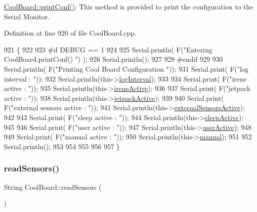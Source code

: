 \hyperlink{class_cool_board_a486507b8f0981d3cc671ed31c2145755}{Cool\+Board\+::print\+Conf()}\+: This method is provided to print the configuration to the Serial Monitor. 

Definition at line 920 of file Cool\+Board.\+cpp.


\begin{DoxyCode}
921 \{
922 
923 \textcolor{preprocessor}{#if DEBUG == 1}
924     
925     Serial.println( F(\textcolor{stringliteral}{"Entering CoolBoard.printConf() "}) );
926     Serial.println();
927 
928 \textcolor{preprocessor}{#endif}
929 
930     Serial.println( F(\textcolor{stringliteral}{"Printing Cool Board Configuration "}));
931     Serial.print( F(\textcolor{stringliteral}{"log interval       : "}));
932     Serial.println(this->\hyperlink{class_cool_board_a84bc94413b64973e4aba8c467c97006c}{logInterval});
933 
934     Serial.print( F(\textcolor{stringliteral}{"irene active       : "}));
935     Serial.println(this->\hyperlink{class_cool_board_a9c3f7ac625481ee2ae802a25d97a4ae0}{ireneActive});
936 
937     Serial.print( F(\textcolor{stringliteral}{"jetpack active     : "}));
938     Serial.println(this->\hyperlink{class_cool_board_a9be03a913d26e558328935ca3b59a75e}{jetpackActive});
939 
940     Serial.print( F(\textcolor{stringliteral}{"external sensors active    : "}));
941     Serial.println(this->\hyperlink{class_cool_board_a638b00b76aeb819ecfd4c10b8cdd7bb7}{externalSensorsActive});
942 
943     Serial.print( F(\textcolor{stringliteral}{"sleep active       : "}));
944     Serial.println(this->\hyperlink{class_cool_board_a0a51b2287139f66c738101fb53139230}{sleepActive});
945 
946     Serial.print( F(\textcolor{stringliteral}{"user active        : "}));
947     Serial.println(this->\hyperlink{class_cool_board_a6395459131d6889a3005f79c7a35e964}{userActive});
948 
949     Serial.print( F(\textcolor{stringliteral}{"manual active      : "}));
950     Serial.println(this->\hyperlink{class_cool_board_a7c8e505a5804b109e112d5a03df6ea2b}{manual});
951 
952     Serial.println();
953 
954 
955 
956 
957 \}
\end{DoxyCode}
\mbox{\label{class_cool_board_ad03abdce2e65f520bbf2cff0f2d083cf}} 
\subsubsection{\texorpdfstring{read\+Sensors()}{readSensors()}}
{\footnotesize\ttfamily String Cool\+Board\+::read\+Sensors (\begin{DoxyParamCaption}{ }\end{DoxyParamCaption})}

